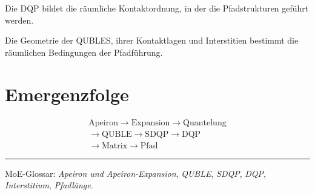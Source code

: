 \documentclass[11pt,a4paper]{article}
\begin{document}
Die DQP bildet die räumliche
Kontaktordnung, in der die
Pfadstrukturen geführt werden.

Die Geometrie der QUBLES,
ihrer Kontaktlagen und
Interstitien bestimmt die
räumlichen Bedingungen
der Pfadführung.

\section*{Emergenzfolge}

\[
\begin{gathered}
\text{Apeiron}
\rightarrow
\text{Expansion}
\rightarrow
\text{Quantelung}
\\[0.4em]
\rightarrow
\text{QUBLE}
\rightarrow
\text{SDQP}
\rightarrow
\text{DQP}
\\[0.4em]
\rightarrow
\text{Matrix}
\rightarrow
\text{Pfad}
\end{gathered}
\]

\vspace{0.9em}
\hrule
\vspace{0.45em}

{\footnotesize
MoE-Glossar:
\emph{Apeiron und Apeiron-Expansion},
\emph{QUBLE},
\emph{SDQP},
\emph{DQP},
\emph{Interstitium},
\emph{Pfadlänge}.
}
\end{document}
